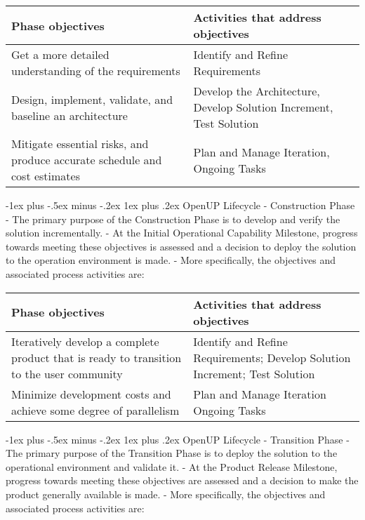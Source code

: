 \documentclass[a4paper]{article}
\makeatletter
\renewcommand{\subsubsection}{\@startsection{subsubsection}{3}{0mm}%
                                {-1ex plus -.5ex minus -.2ex}%
                                {1ex plus .2ex}%
                                {\normalfont\small\bfseries}}
\makeatother
\begin{document}
\begin{multicols}{3}
  \begin{tabular}{l|l}
  Phase objectives                                                           & Activities that address objectives                                  \\\hline
  Get a more detailed understanding of the requirements                      & Identify and Refine Requirements                                    \\
  Design, implement, validate, and baseline an architecture                  & Develop the Architecture, Develop Solution Increment, Test Solution \\
  Mitigate essential risks, and produce accurate schedule and cost estimates & Plan and Manage Iteration, Ongoing Tasks                            
  \end{tabular}
  
  \subsubsection{OpenUP Lifecycle - Construction Phase}
  - The primary purpose of the Construction Phase is to develop and verify the solution incrementally.
  - At the Initial Operational Capability Milestone, progress towards meeting these objectives is assessed and a decision to deploy the solution to the operation environment is made.
  - More specifically, the objectives and associated process activities are:
  
  \begin{tabular}{l|l}
  Phase objectives                                                                         & Activities that address objectives                                          \\\hline
  Iteratively develop a complete product that is ready to transition to the user community & Identify and Refine Requirements; Develop Solution Increment; Test Solution \\
  Minimize development costs and achieve some degree of parallelism                        & Plan and Manage Iteration Ongoing Tasks                                     
  \end{tabular}
  
  \subsubsection{OpenUP Lifecycle - Transition Phase}
  - The primary purpose of the Transition Phase is to deploy the solution to the operational environment and validate it.
  - At the Product Release Milestone, progress towards meeting these objectives are assessed and a decision to make the product generally available is made.
  - More specifically, the objectives and associated process activities are:
  

\end{multicols}
\end{document}
